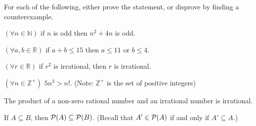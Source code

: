 \documentclass[11pt]{article}
\begin{document}
For each of the following, either prove the statement, or disprove by finding a counterexample.
\begin{Parts}
	\Part $(\forall n \in \mathbb{N})$ if $n$ is odd then $n^2 + 4n$ is odd.

	\Part $(\forall a, b \in \mathbb{R})$ if $a + b \le 15$ then $a \le 11$ or $b \le 4$.

	\Part $(\forall r \in \mathbb{R})$ if $r^2$ is irrational, then $r$ is irrational.

	\Part $(\forall n \in \mathbb{Z}^+)$ $5n^3 > n!$. (Note: $\mathbb{Z}^+$ is the set of positive integers)

  \Part The product of a non-zero rational number and an irrational number is irrational.

	\Part If $A \subseteq B$, then $\mathcal{P}(A) \subseteq \mathcal{P}(B)$.
        (Recall that $A' \in \mathcal{P}(A)$ if and only if $A' \subseteq A$.)
\end{Parts}
\end{document}
